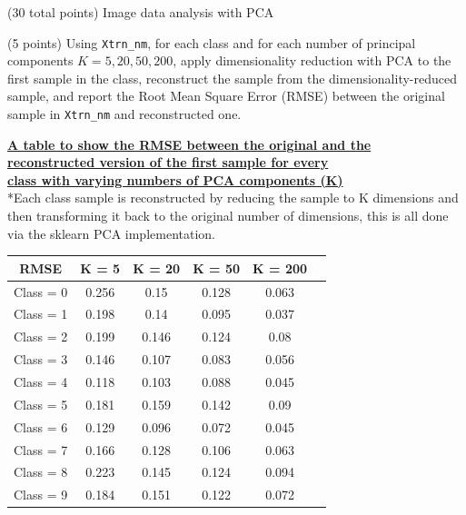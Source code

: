 \documentclass[12pt]{article}
\begin{document}
\begin{question}{(30 total points) Image data analysis with PCA}
\begin{subquestion}
   \end{subquestion}

   \begin{subquestion}{(5 points)
       Using \texttt{Xtrn\_nm}, 
       for each class and for each number of principal components $K =
       5, 20, 50, 200$, apply dimensionality reduction with PCA to the
       first sample in the class, reconstruct the sample from the
       dimensionality-reduced sample, and 
       report the Root Mean Square Error (RMSE) between the
       original sample in {\tt Xtrn\_nm} and reconstructed one.
     } \label{Q1.6}

     

      \begin{answerbox}{28em}
        \begin{center}
        \large{\textbf{\underline{A table to show the RMSE between the original and the}}}\\
        \large{\textbf{\underline{reconstructed version of the first sample for every}}}\\
        \large{\textbf{\underline{class with varying numbers of PCA components (K)}}} \\
        \vspace{0.3cm}
        \normalsize{*Each class sample is reconstructed by reducing the sample to K dimensions and then transforming it back to the original number of dimensions, this is all done via the sklearn PCA implementation.}\\
        \vspace{0.5cm}
        \begin{tabular}{ |c|c|c|c|c|c| } \hline
            \textbf{RMSE} & K = 5 & K = 20 & K = 50 & K = 200 \\ \hline
            Class = 0 & 0.256 & 0.15 & 0.128 & 0.063 \\
            Class = 1 & 0.198 & 0.14 & 0.095 & 0.037 \\
            Class = 2 & 0.199 & 0.146 & 0.124 & 0.08 \\
            Class = 3 & 0.146 & 0.107 & 0.083 & 0.056 \\
            Class = 4 & 0.118 & 0.103 & 0.088 & 0.045 \\
            Class = 5 & 0.181 & 0.159 & 0.142 & 0.09 \\
            Class = 6 & 0.129 & 0.096 & 0.072 & 0.045 \\
            Class = 7 & 0.166 & 0.128 & 0.106 & 0.063 \\
            Class = 8 & 0.223 & 0.145 & 0.124 & 0.094 \\
            Class = 9 & 0.184 & 0.151 & 0.122 & 0.072 \\
            \hline
        \end{tabular}
        \end{center}
      \end{answerbox}
  



\end{subquestion}
\end{question}
\end{document}
